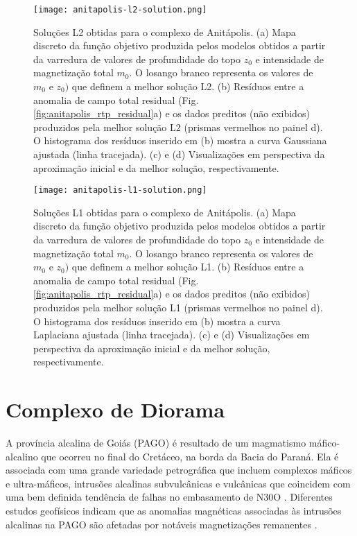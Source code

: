 \pagebreak

\begin{figure}[!htb]
	\texttt{[image: anitapolis-l2-solution.png]}
	\caption{Soluções L2 obtidas para o complexo de Anitápolis. 
		(a) Mapa discreto da função objetivo produzida pelos modelos obtidos a partir da varredura de valores de profundidade do topo $z_{0}$ e intensidade de magnetização total $m_{0}$. 
		O losango branco representa os valores de $m_{0}$ e $z_{0})$ que definem a melhor solução L2.
		(b) Resíduos entre a anomalia de campo total residual (Fig. \ref{fig:anitapolis_rtp_residual}a) e os dados preditos (não exibidos) produzidos pela melhor solução L2 (prismas vermelhos no painel d). 
		O histograma dos resíduos inserido em (b) mostra a curva
		Gaussiana ajustada (linha tracejada). 
		(c) e (d) Visualizações em perspectiva da aproximação inicial e da melhor solução, respectivamente.
	}
	\label{fig:anitapolis_l2_result}
\end{figure}

\pagebreak

\begin{figure}[!htb]
	\texttt{[image: anitapolis-l1-solution.png]}
	\caption{Soluções L1 obtidas para o complexo de Anitápolis. 
		(a) Mapa discreto da função objetivo produzida pelos modelos obtidos a partir da varredura de valores de profundidade do topo $z_{0}$ e intensidade de magnetização total $m_{0}$. 
		O losango branco representa os valores de $m_{0}$ e $z_{0})$ que definem a melhor solução L1.
		(b) Resíduos entre a anomalia de campo total residual (Fig. \ref{fig:anitapolis_rtp_residual}a) e os dados preditos (não exibidos) produzidos pela melhor solução L1 (prismas vermelhos no painel d). 
		O histograma dos resíduos inserido em (b) mostra a curva
		Laplaciana ajustada (linha tracejada). 
		(c) e (d) Visualizações em perspectiva da aproximação inicial e da melhor solução, respectivamente.
	}
	\label{fig:anitapolis_l1_result}
\end{figure}
\pagebreak


\section{Complexo de Diorama}
\label{subsec:diorama_complex}


A província alcalina de Goiás (PAGO) é resultado de um magmatismo máfico-alcalino que ocorreu no final do Cretáceo, na borda da Bacia do Paraná.
Ela é associada com uma grande variedade petrográfica que incluem complexos máficos e ultra-máficos, intrusões alcalinas subvulcânicas e vulcânicas que coincidem com uma bem definida tendência de falhas no embasamento de N30O \citep{junqueirabrod_etal2002, junqueira_brod2005}.
Diferentes estudos geofísicos indicam que as anomalias magnéticas associadas às intrusões alcalinas na PAGO são afetadas por notáveis magnetizações remanentes \citep[por exemplo,][]{dutra_etal2012, marangoni_mantovani2013, 
dutra_etal2014, oliveirajr_etal2015, zhang-2018, reis_etal2020}.

